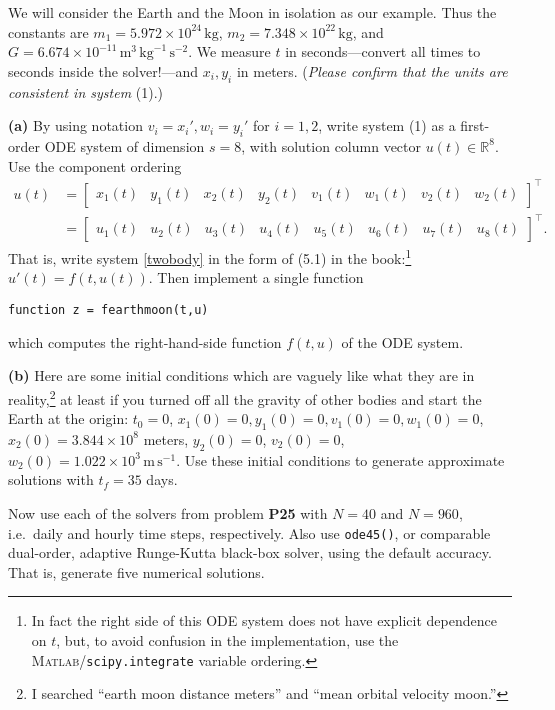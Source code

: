 \documentclass[12pt]{amsart}
\newcommand{\RR}{\mathbb{R}}
\newcommand{\Matlab}{\textsc{Matlab}\xspace}
\newcommand{\epart}[1]{\medskip\noindent\textbf{(#1)}\quad }
\begin{document}
We will consider the Earth and the Moon in isolation as our example.  Thus the constants are $m_1 = 5.972 \times 10^{24} \,\text{kg}$, $m_2 = 7.348 \times 10^{22} \,\text{kg}$, and $G = 6.674 \times 10^{-11}\,\text{m}^3\,\text{kg}^{-1}\,\text{s}^{-2}$.  We measure $t$ in seconds---convert all times to seconds inside the solver!---and $x_i,y_i$ in meters.  (\emph{Please confirm that the units are consistent in system} (1).)

\epart{a} By using notation $v_i=x_i', w_i=y_i'$ for $i=1,2$, write system (1) as a first-order ODE system of dimension $s=8$, with solution column vector $u(t)\in\RR^8$.  Use the component ordering
\begin{align*}
u(t) &= \begin{bmatrix} x_1(t) & y_1(t) & x_2(t) & y_2(t) & v_1(t) & w_1(t) & v_2(t) & w_2(t) \end{bmatrix}^\top \\
     &= \begin{bmatrix} u_1(t) & u_2(t) & u_3(t) & u_4(t) & u_5(t) & u_6(t) & u_7(t) & u_8(t) \end{bmatrix}^\top.
\end{align*}
That is, write system \eqref{twobody} in the form of (5.1) in the book:\footnote{In fact the right side of this ODE system does not have explicit dependence on $t$, but, to avoid confusion in the implementation, use the \Matlab/\texttt{scipy.integrate} variable ordering.} $u'(t) = f(t,u(t))$.  Then implement a single function

\centerline{\texttt{function z = fearthmoon(t,u)}}

\noindent which computes the right-hand-side function $f(t,u)$ of the ODE system.

\epart{b}  Here are some initial conditions which are vaguely like what they are in reality,\footnote{I searched ``earth moon distance meters'' and ``mean orbital velocity moon.''} at least if you turned off all the gravity of other bodies and start the Earth at the origin: $t_0=0$, $x_1(0)=0,y_1(0)=0,v_1(0)=0,w_1(0)=0$, $x_2(0)=3.844\times 10^8$ meters, $y_2(0)=0$, $v_2(0)=0$, $w_2(0)=1.022\times 10^3 \,\text{m}\,\text{s}^{-1}$.  Use these initial conditions to generate approximate solutions with $t_f=35$ days.

Now use each of the solvers from problem \textbf{P25} with $N=40$ and $N=960$, i.e.~daily and hourly time steps, respectively.  Also use \texttt{ode45()}, or comparable dual-order, adaptive Runge-Kutta black-box solver, using the default accuracy.  That is, generate five numerical solutions.
\end{document}
